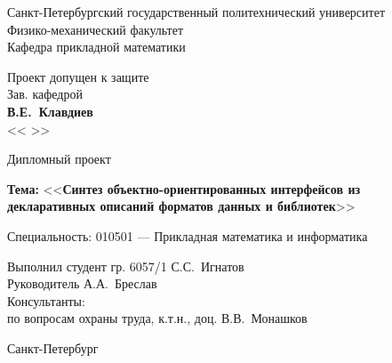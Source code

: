 \begin{titlepage}
\newpage

\begin{center}
Санкт-Петербургский государственный политехнический университет \\
Физико-механический факультет \\
Кафедра прикладной математики \\
\end{center}


\begin{flushright}
Проект допущен к защите \\
Зав. кафедрой \makebox[2.1cm]{\hfill} \\
\makebox[1.7cm]{\hrulefill} \textbf{В.Е.~Клавдиев} \\
<< \makebox[1.1cm]{\hrulefill} >> \makebox[3cm]{\hrulefill} \\

\end{flushright}

\vspace{4em}

\begin{center}
\Large Дипломный проект
\end{center}
\begin{center}
\textbf{Тема:} <<\textbf{Синтез объектно-ориентированных интерфейсов из \\
 декларативных описаний форматов данных и библиотек}>>
\end{center}

\vspace{2em}

\begin{flushleft}
Специальность: 010501 --- Прикладная математика и информатика
\end{flushleft}

\vspace{3em}

\begin{flushleft}
Выполнил студент гр. 6057/1 \hfill С.С.~Игнатов \\
\vspace{1.5em}
Руководитель \hfill А.А.~Бреслав \\
\vspace{3.5em}
Консультанты: \\
\hspace{1em} по вопросам охраны труда, к.т.н., доц. \hfill В.В.~Монашков
\end{flushleft}

\vspace{\fill}

\begin{center}
Санкт-Петербург \\
\number\year

\end{center}

\end{titlepage}
